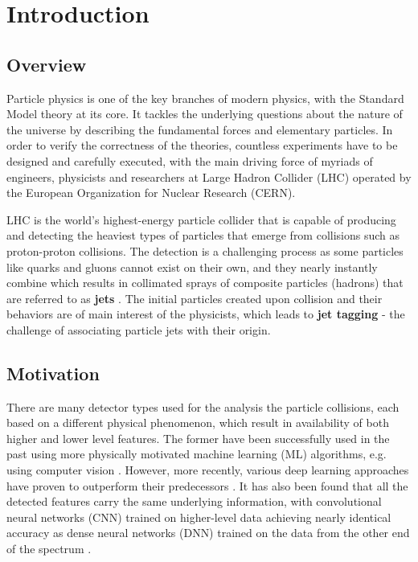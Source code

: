 \chapter{Introduction}

\section{Overview}
Particle physics is one of the key branches of modern physics, with the Standard Model theory at its core. It tackles the underlying questions about the nature of the universe by describing the fundamental forces and elementary particles. In order to verify the correctness of the theories, countless experiments have to be designed and carefully executed, with the main driving force of myriads of engineers, physicists and researchers at Large Hadron Collider (LHC) operated by the European Organization for Nuclear Research (CERN).

LHC is the world's highest-energy particle collider that is capable of producing and detecting the heaviest types of particles that emerge from collisions such as proton-proton collisions. The detection is a challenging process as some particles like quarks and gluons cannot exist on their own, and they nearly instantly combine which results in collimated sprays of composite particles (hadrons) that are referred to as \textbf{jets} \cite{4-cernjets}. The initial particles created upon collision and their behaviors are of main interest of the physicists, which leads to \textbf{jet tagging} - the challenge of associating particle jets with their origin.


\section{Motivation}\label{motivation}
There are many detector types used for the analysis the particle collisions, each based on a different physical phenomenon, which result in availability of both higher and lower level features. The former have been successfully used in the past using more physically motivated machine learning (ML) algorithms, e.g. using computer vision \cite{5-cogan2015jet-images:}. However, more recently, various deep learning approaches have proven to outperform their predecessors \cite{6-de2016jet-images}. It has also been found that all the detected features carry the same underlying information, with convolutional neural networks (CNN) trained on higher-level data achieving nearly identical accuracy as dense neural networks (DNN) trained on the data from the other end of the spectrum \cite{7-moore2019reports}.

